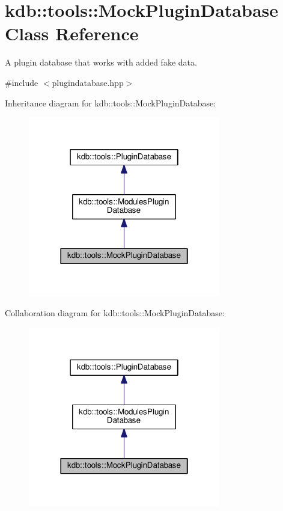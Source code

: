 \hypertarget{classkdb_1_1tools_1_1MockPluginDatabase}{}\section{kdb\+:\+:tools\+:\+:Mock\+Plugin\+Database Class Reference}
\label{classkdb_1_1tools_1_1MockPluginDatabase}


A plugin database that works with added fake data.  




{\ttfamily \#include $<$plugindatabase.\+hpp$>$}



Inheritance diagram for kdb\+:\+:tools\+:\+:Mock\+Plugin\+Database\+:
\nopagebreak
\begin{figure}[H]
\begin{center}
\leavevmode
\includegraphics[width=238pt]{classkdb_1_1tools_1_1MockPluginDatabase__inherit__graph}
\end{center}
\end{figure}


Collaboration diagram for kdb\+:\+:tools\+:\+:Mock\+Plugin\+Database\+:
\nopagebreak
\begin{figure}[H]
\begin{center}
\leavevmode
\includegraphics[width=238pt]{classkdb_1_1tools_1_1MockPluginDatabase__coll__graph}
\end{center}
\end{figure}

